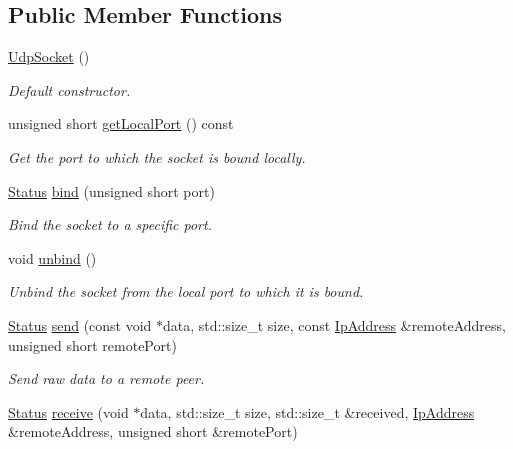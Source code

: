 \subsection*{Public Member Functions}
\begin{DoxyCompactItemize}
\item 
\hypertarget{classsf_1_1_udp_socket_abb10725e26dee9d3a8165fe87ffb71bb}{\hyperlink{classsf_1_1_udp_socket_abb10725e26dee9d3a8165fe87ffb71bb}{Udp\+Socket} ()}\label{classsf_1_1_udp_socket_abb10725e26dee9d3a8165fe87ffb71bb}

\begin{DoxyCompactList}\small\item\em Default constructor. \end{DoxyCompactList}\item 
unsigned short \hyperlink{classsf_1_1_udp_socket_a8ce625debd4b1f885366a69faa270086}{get\+Local\+Port} () const 
\begin{DoxyCompactList}\small\item\em Get the port to which the socket is bound locally. \end{DoxyCompactList}\item 
\hyperlink{classsf_1_1_socket_a51bf0fd51057b98a10fbb866246176dc}{Status} \hyperlink{classsf_1_1_udp_socket_ab0bf8d32849836f92beb2fd734565481}{bind} (unsigned short port)
\begin{DoxyCompactList}\small\item\em Bind the socket to a specific port. \end{DoxyCompactList}\item 
void \hyperlink{classsf_1_1_udp_socket_a2c4abb8102a1bd31f51fcfe7f15427a3}{unbind} ()
\begin{DoxyCompactList}\small\item\em Unbind the socket from the local port to which it is bound. \end{DoxyCompactList}\item 
\hyperlink{classsf_1_1_socket_a51bf0fd51057b98a10fbb866246176dc}{Status} \hyperlink{classsf_1_1_udp_socket_a664ab8f26f37c21cc4de1b847c2efcca}{send} (const void $\ast$data, std\+::size\+\_\+t size, const \hyperlink{classsf_1_1_ip_address}{Ip\+Address} \&remote\+Address, unsigned short remote\+Port)
\begin{DoxyCompactList}\small\item\em Send raw data to a remote peer. \end{DoxyCompactList}\item 
\hyperlink{classsf_1_1_socket_a51bf0fd51057b98a10fbb866246176dc}{Status} \hyperlink{classsf_1_1_udp_socket_ade9ca0f7ed7919136917b0b997a9833a}{receive} (void $\ast$data, std\+::size\+\_\+t size, std\+::size\+\_\+t \&received, \hyperlink{classsf_1_1_ip_address}{Ip\+Address} \&remote\+Address, unsigned short \&remote\+Port)

\end{DoxyCompactItemize}
